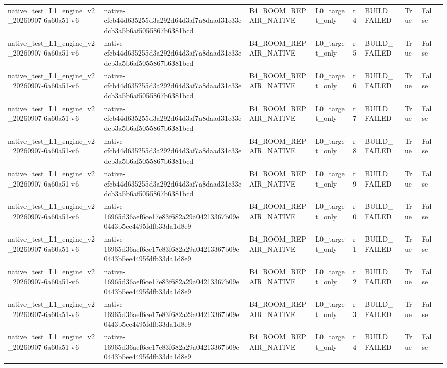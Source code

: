 \begin{tabular}{lllllllll}
native\_test\_L1\_engine\_v2\_20260907-6a60a51-v6 & native-cfcb44d635255d3a292d64d3af7a8daad31c33edcb3a5b6af5055867b6381bcd & B4\_ROOM\_REPAIR\_NATIVE & L0\_target\_only & r4 & BUILD\_FAILED & True & False &  \\
native\_test\_L1\_engine\_v2\_20260907-6a60a51-v6 & native-cfcb44d635255d3a292d64d3af7a8daad31c33edcb3a5b6af5055867b6381bcd & B4\_ROOM\_REPAIR\_NATIVE & L0\_target\_only & r5 & BUILD\_FAILED & True & False &  \\
native\_test\_L1\_engine\_v2\_20260907-6a60a51-v6 & native-cfcb44d635255d3a292d64d3af7a8daad31c33edcb3a5b6af5055867b6381bcd & B4\_ROOM\_REPAIR\_NATIVE & L0\_target\_only & r6 & BUILD\_FAILED & True & False &  \\
native\_test\_L1\_engine\_v2\_20260907-6a60a51-v6 & native-cfcb44d635255d3a292d64d3af7a8daad31c33edcb3a5b6af5055867b6381bcd & B4\_ROOM\_REPAIR\_NATIVE & L0\_target\_only & r7 & BUILD\_FAILED & True & False &  \\
native\_test\_L1\_engine\_v2\_20260907-6a60a51-v6 & native-cfcb44d635255d3a292d64d3af7a8daad31c33edcb3a5b6af5055867b6381bcd & B4\_ROOM\_REPAIR\_NATIVE & L0\_target\_only & r8 & BUILD\_FAILED & True & False &  \\
native\_test\_L1\_engine\_v2\_20260907-6a60a51-v6 & native-cfcb44d635255d3a292d64d3af7a8daad31c33edcb3a5b6af5055867b6381bcd & B4\_ROOM\_REPAIR\_NATIVE & L0\_target\_only & r9 & BUILD\_FAILED & True & False &  \\
native\_test\_L1\_engine\_v2\_20260907-6a60a51-v6 & native-16965d36aef6ce17e83f682a29a04213367b09e0443b5ee4495fdfb33da1d8e9 & B4\_ROOM\_REPAIR\_NATIVE & L0\_target\_only & r0 & BUILD\_FAILED & True & False &  \\
native\_test\_L1\_engine\_v2\_20260907-6a60a51-v6 & native-16965d36aef6ce17e83f682a29a04213367b09e0443b5ee4495fdfb33da1d8e9 & B4\_ROOM\_REPAIR\_NATIVE & L0\_target\_only & r1 & BUILD\_FAILED & True & False &  \\
native\_test\_L1\_engine\_v2\_20260907-6a60a51-v6 & native-16965d36aef6ce17e83f682a29a04213367b09e0443b5ee4495fdfb33da1d8e9 & B4\_ROOM\_REPAIR\_NATIVE & L0\_target\_only & r2 & BUILD\_FAILED & True & False &  \\
native\_test\_L1\_engine\_v2\_20260907-6a60a51-v6 & native-16965d36aef6ce17e83f682a29a04213367b09e0443b5ee4495fdfb33da1d8e9 & B4\_ROOM\_REPAIR\_NATIVE & L0\_target\_only & r3 & BUILD\_FAILED & True & False &  \\
native\_test\_L1\_engine\_v2\_20260907-6a60a51-v6 & native-16965d36aef6ce17e83f682a29a04213367b09e0443b5ee4495fdfb33da1d8e9 & B4\_ROOM\_REPAIR\_NATIVE & L0\_target\_only & r4 & BUILD\_FAILED & True & False &  \\

\end{tabular}
